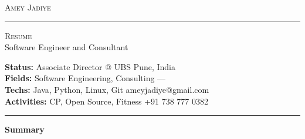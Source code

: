 \documentclass[10pt,A4]{article}
\newcommand{\cvsection}[1]
{
	\begin{center}
		\large\textcolor{sectcol}{\textbf{#1}}
	\end{center}
}
\newcommand{\metasection}[2]
{
\footnotesize{#2} \hspace*{\fill} \footnotesize{#1}\\[1pt]
}
\begin{document}
\pagestyle{fancy}	








\vspace{-8pt}
\begin{center}
	\HUGE \textsc{Amey Jadiye} \textcolor{sectcol}{\rule[-1mm]{1mm}{0.9cm}} \textsc{Resume}\\[2pt]
	\small Software Engineer and Consultant
\end{center}



\vspace{6pt}


\metasection{Pune, India}{\textbf{Status:} Associate Director @ UBS}
\metasection{---}{\textbf{Fields:} Software Engineering, Consulting} 
\metasection{ameyjadiye@gmail.com}{\textbf{Techs:} Java, Python, Linux, Git}
\metasection{+91 738 777 0382}{\textbf{Activities:} CP, Open Source, Fitness}
\vspace{-2pt}
\textcolor{softcol}{\hrule}
\vspace{6pt}

\normalsize

\vspace{-6pt}
\cvsection{Summary}
\end{document}

